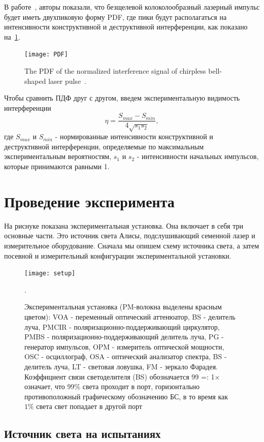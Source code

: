 В работе~\cite{shakhovoy2021}, авторы показали, что безщелевой колоколообразный лазерный импульс будет иметь двухпиковую форму PDF, где пики будут располагаться на интенсивности конструктивной и деструктивной интерференции, как показано на~\cref{fig:PDF}.
\begin{figure}
\texttt{[image: PDF]}
\caption{The PDF of the normalized interference signal of chirpless bell-shaped laser pulse~\cite{shakhovoy2021}.}
\label{fig:PDF}
\end{figure}
Чтобы сравнить ПДФ друг с другом, введем экспериментальную видимость интерференции
\begin{equation}
\label{eq:visibility}
	\eta = {\frac{S_{max} - S_{min}}{4\sqrt{s_1 s_2}}},
\end{equation}
где $S_{max}$ и $S_{min}$ - нормированные интенсивности конструктивной и деструктивной интерференции, определяемые по максимальным экспериментальным вероятностям, $s_1$ и $s_2$ - интенсивности начальных импульсов, которые принимаются равными 1.
\section{Проведение эксперимента}
\label{sec:experiment} 

На риснуке  показана экспериментальная установка. Она включает в себя три основные части. Это источник света Алисы, подслушивающий семенной лазер и измерительное оборудование. Сначала мы опишем схему источника света, а затем посевной и измерительный конфигурации экспериментальной установки. 
\begin{figure}
\texttt{[image: setup]}
\caption{Экспериментальная установка (PM-волокна выделены красным цветом): VOA - переменный оптический аттенюатор, BS - делитель луча, PMCIR - поляризационно-поддерживающий циркулятор, PMBS - поляризационно-поддерживающий делитель луча, PG - генератор импульсов, OPM - измеритель оптической мощности, OSC - осциллограф, OSA - оптический анализатор спектра, BS - делитель луча, LT - световая ловушка, FM - зеркало Фарадея. Коэффициент связи светоделителя (BS) обозначается 99 =: 1× означает, что $99\%$ света проходит в порт, горизонтально противоположный графическому обозначению БС, в то время как $1\%$ света
свет попадает в другой порт}.
\label{fig:setup}
\end{figure}
\subsection{Источник света на испытаниях}

